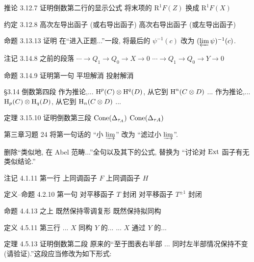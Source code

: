 \documentclass{AJerrata}
\begin{document}
\begin{Errata}
		\item[推论 3.12.7 证明倒数第二行的显示公式]
		将末项的 $\mathrm{R}^1 F(Z)$ 换成 $\mathrm{R}^1 F(X)$
		
		\item[约定 3.12.8]
		\Orig 高次左导出函子 (或右导出函子)
		\Corr 高次右导出函子 (或左导出函子)
		
		\item[命题 3.13.13 证明]
		在``进入正题...''一段, 将最后的 $\psi^{-1}(c)$ 改为 $(\varprojlim \psi)^{-1}(c)$.
		
		\item[注记 3.14.8 之前的段落]
		\Orig $\cdots \to Q_1 \to Q_0 \to X \to 0$
		\Corr $\cdots \to Q_1 \to Q_0 \to Y \to 0$
		
		\item[命题 3.14.9 证明第一句]
		\Orig 平坦解消
		\Corr 投射解消
		
		\item[\S 3.14 倒数第四段]
		\Orig 作为推论,... $\operatorname{H}^p(C) \otimes \operatorname{H}^q(D)$, 从它到 $\operatorname{H}^n(C \otimes D)$ ...
		\Corr 作为推论,... $\operatorname{H}_p(C) \otimes \operatorname{H}_q(D)$, 从它到 $\operatorname{H}_n(C \otimes D)$ ...
		
		\item[定理 3.15.10 证明倒数第三段]
		\Orig $\operatorname{Cone}(\Delta_{\tau_A})$
		\Corr $\operatorname{Cone}(\Delta_{\tau A})$
		
		\item[第三章习题 24]
		将第一句话的 ``小 $\varinjlim$'' 改为 ``滤过小 $\varinjlim$''.
		
		删除``类似地, 在 Abel 范畴...''全句以及其下的公式, 替换为 ``讨论对 $\operatorname{Ext}$ 函子有无类似结论.''
		
		\item[注记 4.1.11 第一行]
		\Orig 上同调函子 $F$
		\Corr 上同调函子 $H$
		
		\item[定义--命题 4.2.10 第一句]
		\Orig 对平移函子 $T$ 封闭
		\Corr 对平移函子 $T^{\pm 1}$ 封闭
		
		\item[命题 4.4.13 之上]
		\Orig 既然保持零调复形
		\Corr 既然保持拟同构
		
		\item[定义 4.5.11 第三行]
		\Orig ... $X$ 同构 $Y$ 的...
		\Corr ... $X$ 通过 $Y$ 的...
		
		\item[定理 4.5.13 证明倒数第二段]
		原来的``至于图表右半部 ... 同时左半部情况保持不变 (请验证).''这段应当修改为如下形式:
		

\end{Errata}
\end{document}
